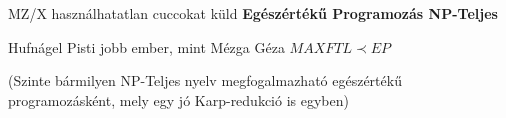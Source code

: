 	\begin{tetel}{MZ/X használhatatlan cuccokat küld}
   \textbf{Egészértékű Programozás NP-Teljes  } \\[3pt]
   \end{tetel}

	 \begin{bizonyitas}{Hufnágel Pisti jobb ember, mint Mézga Géza}
    $MAXFTL \prec EP$

	 (Szinte bármilyen NP-Teljes nyelv megfogalmazható egészértékű programozásként, mely egy jó Karp-redukció is egyben)\\[0pt]
\end{bizonyitas}
